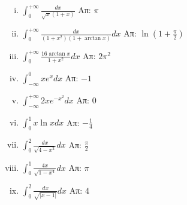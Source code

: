 \begin{enumerate}
\begin{enumerate}[i)]
\item $\int_{0}^{+\infty}\frac{dx}{\sqrt{x}(1+x)}$ \hfill Απ: $\pi$

\item $\int_{0}^{+\infty}\frac{dx}{(1+x^2)(1+\arctan{x})}dx$ \hfill Απ: $\ln (1+\frac{\pi}{2})$

\item $\int_{0}^{+\infty}\frac{16\arctan{x}}{1+x^2}dx$ \hfill Απ: $2\pi^2$

\item $\int_{-\infty}^{0}xe^x dx$ \hfill Απ: $-1$

\item $\int_{-\infty}^{+\infty}2xe^{-x^2}dx$ \hfill Απ: $0$

\item $\int_{0}^{1}x\ln x dx$ \hfill Απ: $-\frac{1}{4}$

\item $\int_{0}^{2}\frac{dx}{\sqrt{4-x^2}}dx$ \hfill Απ: $\frac{\pi}{2}$

\item $\int_{0}^{1}\frac{4x}{\sqrt{1-x^4}}dx$ \hfill Απ: $\pi$

\item $\int_{0}^{2}\frac{dx}{\sqrt{|x-1|}}dx$ \hfill Απ: $4$


\end{enumerate}


\end{enumerate}


